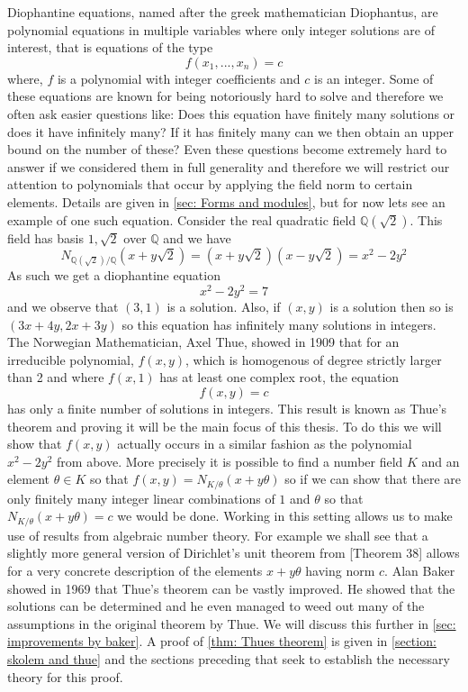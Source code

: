 \documentclass{article}
\newcommand{\mbb}[1]{\mathbb{#1}}
\numberwithin{equation}{section}
\begin{document}
Diophantine equations, named after the greek mathematician Diophantus, are polynomial equations in multiple variables where only integer solutions are of interest, that is equations of the type 
$$f(x_1, ..., x_n) = c$$
where, $f$ is a polynomial with integer coefficients and $c$ is an integer. Some of these equations are known for being notoriously hard to solve and therefore we often ask easier questions like: Does this equation have finitely many solutions or does it have infinitely many? If it has finitely many can we then obtain an upper bound on the number of these? Even these questions become extremely hard to answer if we considered them in full generality and therefore we will restrict our attention to polynomials that occur by applying the field norm to certain elements. Details are given in \cref{sec: Forms and modules}, but for now lets see an example of one such equation. Consider the real quadratic field $\mbb Q(\sqrt 2)$. This field has basis $1,\sqrt 2$ over $\mbb Q$ and we have
$$N_{\mbb Q(\sqrt 2)/\mbb Q}(x + y\sqrt 2) = (x + y\sqrt 2)(x - y\sqrt 2) = x^2 - 2y^2$$
As such we get a diophantine equation
$$x^2 - 2y^2 = 7$$
and we observe that $(3,1)$ is a solution. Also, if $(x,y)$ is a solution then so is $(3x + 4y, 2x + 3y)$ so this equation has infinitely many solutions in integers. The Norwegian Mathematician, Axel Thue, showed in 1909 that for an irreducible polynomial, $f(x,y)$, which is homogenous of degree strictly larger than 2 and where $f(x,1)$ has at least one complex root, the equation
$$f(x,y) = c$$
has only a finite number of solutions in integers. This result is known as Thue's theorem and proving it will be the main focus of this thesis. To do this we will show that $f(x,y)$ actually occurs in a similar fashion as the polynomial $x^2 - 2y^2$ from above. More precisely it is possible to find a number field $K$ and an element $\theta \in K$ so that $f(x,y) = N_{K / \theta}(x + y\theta)$ so if we can show that there are only finitely many integer linear combinations of $1$ and $\theta$ so that $N_{K / \theta}(x + y\theta) = c$ 
we would be done. Working in this setting allows us to make use of results from algebraic number theory. For example we shall see that a slightly more general version of Dirichlet's unit theorem from \citep{marcus}[Theorem 38] allows for a very concrete description of the elements $x + y\theta$ having norm $c$. Alan Baker showed in 1969 that Thue's theorem can be vastly improved. He showed that the solutions can be determined and he even managed to weed out many of the assumptions in the original theorem by Thue. We will discuss this further in \cref{sec: improvements by baker}. A proof of \cref{thm: Thues theorem} is given in \cref{section: skolem and thue} and the sections preceding that seek to establish the necessary theory for this proof.  
\end{document}
